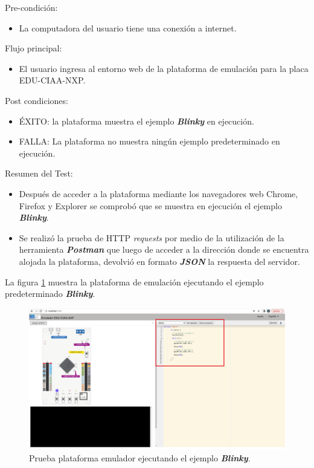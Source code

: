 Pre-condición: 
\begin{itemize}
	\item La computadora del usuario tiene una conexión a internet.
\end{itemize}

Flujo principal:
\begin{itemize}
	\item El usuario ingresa al entorno web de la plataforma de emulación para la placa EDU-CIAA-NXP.
\end{itemize}
Post condiciones:
\begin{itemize}
	\item ÉXITO: la plataforma muestra el ejemplo \textit{\textbf{Blinky}} en ejecución.
	\item FALLA: La plataforma no muestra ningún ejemplo predeterminado en ejecución.
\end{itemize}

Resumen del Test:
\begin{itemize}
	\item Después de acceder a la plataforma mediante los navegadores web Chrome, Firefox y Explorer se comprobó que se muestra en ejecución el ejemplo \textit{\textbf{Blinky}}.
	\item Se realizó la prueba de HTTP \textit{requests} por medio de la utilización de la herramienta \textit{\textbf{Postman}} que luego de acceder a la dirección donde se encuentra alojada la plataforma, devolvió en formato \textit{\textbf{JSON}} la respuesta del servidor.
\end{itemize}


La figura \ref{fig:PlataformaEmuladorBlinky} muestra la plataforma de emulación ejecutando el ejemplo predeterminado \textit{\textbf{Blinky}}.

\begin{figure}[ht]
	\centering
	\includegraphics[scale=.21]{./Figures/PlataformaEmuladorBlinky.png}
	\caption{Prueba plataforma emulador ejecutando el ejemplo \textit{\textbf{Blinky}}.}
	\label{fig:PlataformaEmuladorBlinky}
\end{figure}

